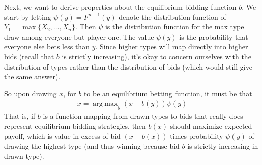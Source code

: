 \documentclass[12pt]{article}
\theoremstyle{plain}
\theoremstyle{definition}
\theoremstyle{remark}
\DeclareMathOperator*{\argmax}{arg\;max}
\begin{document}
Next, we want to derive properties about the equilibrium bidding
function $b$. We start by letting $\psi(y)=F^{n-1}(y)$ denote the
distribution function of $Y_1=\max\{X_2,\ldots,X_n\}$. Then $\psi$ is
the distribution function for the max type draw among everyone but
player one.  The value $\psi(y)$ is the probability that everyone else
bets less than $y$.  Since higher types will map directly into higher
bids (recall that $b$ is strictly increasing), it's okay to concern
ourselves with the distribution of types rather than the distribution of
bids (which would still give the same answer).

So upon drawing $x$, for $b$ to be an equilibrium betting function, it
must be that
\begin{align*}
  x =
  \argmax_y (x-b(y))\psi(y)
\end{align*}
That is, if $b$ is a function mapping from drawn types to bids that
really does represent equilibrium bidding strategies, then $b(x)$ should
maximize expected payoff, which is value in excess of bid $(x-b(x))$
times probability $\psi(y)$ of drawing the highest type (and thus
winning because bid $b$ is strictly increasing in drawn type).
\end{document}
